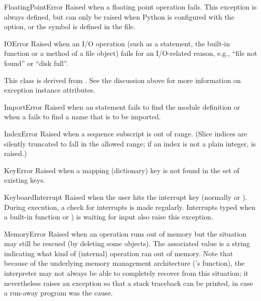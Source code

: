 \begin{excdesc}{FloatingPointError}
  Raised when a floating point operation fails.  This exception is
  always defined, but can only be raised when Python is configured
  with the  option, or the
   symbol is defined in the
   file.
\end{excdesc}

\begin{excdesc}{IOError}
  Raised when an I/O operation (such as a  statement,
  the built-in  function or a method of a file
  object) fails for an I/O-related reason, e.g., ``file not found'' or
  ``disk full''.

  This class is derived from .  See the
  discussion above for more information on exception instance
  attributes.
\end{excdesc}

\begin{excdesc}{ImportError}
  Raised when an  statement fails to find the module
  definition or when a  fails to find a
  name that is to be imported.
\end{excdesc}

\begin{excdesc}{IndexError}
  Raised when a sequence subscript is out of range.  (Slice indices are
  silently truncated to fall in the allowed range; if an index is not a
  plain integer,  is raised.)
\end{excdesc}

\begin{excdesc}{KeyError}
  Raised when a mapping (dictionary) key is not found in the set of
  existing keys.
\end{excdesc}

\begin{excdesc}{KeyboardInterrupt}
  Raised when the user hits the interrupt key (normally
   or ).  During execution, a check for
  interrupts is made regularly.
  Interrupts typed when a built-in function  or
  ) is waiting for input also raise this
  exception.
\end{excdesc}

\begin{excdesc}{MemoryError}
  Raised when an operation runs out of memory but the situation may
  still be rescued (by deleting some objects).  The associated value is
  a string indicating what kind of (internal) operation ran out of memory.
  Note that because of the underlying memory management architecture
  (\C{}'s  function), the interpreter may not
  always be able to completely recover from this situation; it
  nevertheless raises an exception so that a stack traceback can be
  printed, in case a run-away program was the cause.
\end{excdesc}

